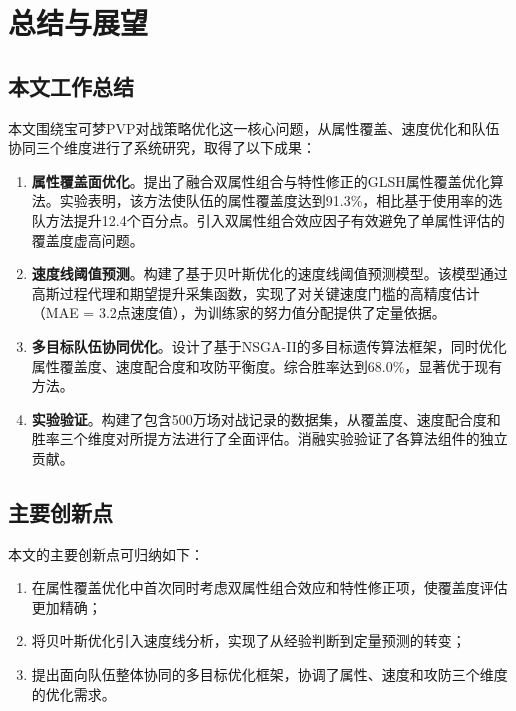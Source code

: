 \chapter{总结与展望}\label{chap:conclusion}

\section{本文工作总结}

本文围绕宝可梦PVP对战策略优化这一核心问题，从属性覆盖、速度优化和队伍协同三个维度进行了系统研究，取得了以下成果：

\begin{enumerate}
    \item \textbf{属性覆盖面优化}。提出了融合双属性组合与特性修正的GLSH属性覆盖优化算法。实验表明，该方法使队伍的属性覆盖度达到91.3\%，相比基于使用率的选队方法提升12.4个百分点。引入双属性组合效应因子有效避免了单属性评估的覆盖度虚高问题。

    \item \textbf{速度线阈值预测}。构建了基于贝叶斯优化的速度线阈值预测模型。该模型通过高斯过程代理和期望提升采集函数，实现了对关键速度门槛的高精度估计（MAE = 3.2点速度值），为训练家的努力值分配提供了定量依据。

    \item \textbf{多目标队伍协同优化}。设计了基于NSGA-II的多目标遗传算法框架，同时优化属性覆盖度、速度配合度和攻防平衡度。综合胜率达到68.0\%，显著优于现有方法。

    \item \textbf{实验验证}。构建了包含500万场对战记录的数据集，从覆盖度、速度配合度和胜率三个维度对所提方法进行了全面评估。消融实验验证了各算法组件的独立贡献。
\end{enumerate}

\section{主要创新点}

本文的主要创新点可归纳如下：

\begin{enumerate}
    \item 在属性覆盖优化中首次同时考虑双属性组合效应和特性修正项，使覆盖度评估更加精确；
    \item 将贝叶斯优化引入速度线分析，实现了从经验判断到定量预测的转变；
    \item 提出面向队伍整体协同的多目标优化框架，协调了属性、速度和攻防三个维度的优化需求。
\end{enumerate}


